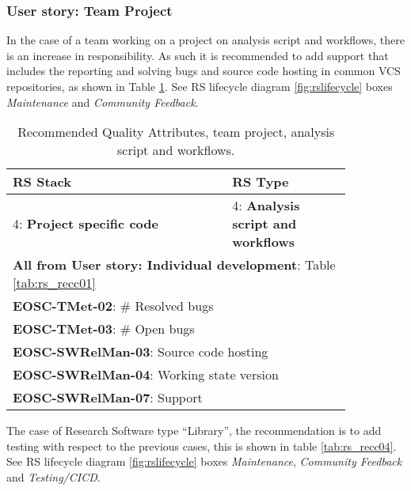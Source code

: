 \subsubsection{User story: Team Project}

In the case of a team working on a project on analysis script and workflows, there is an increase in responsibility. As such it is recommended to add support that includes the reporting and solving bugs and source code hosting in common VCS repositories, as shown in Table \ref{tab:rs_recc03}. See RS lifecycle diagram \ref{fig:rslifecycle} boxes \textit{Maintenance} and \textit{Community Feedback}.

\begin{table}[h]
  \centering
  \scriptsize
  \begin{tabular}{|p{0.55\linewidth}|p{0.3\linewidth}|} \hline

    \textbf{RS Stack} & \textbf{RS Type} \\ \hline \hline
    4: \textbf{Project specific code} & 4: \textbf{Analysis script and workflows} \\ \hline
    \multicolumn{2}{|l|}{\textbf{All from User story: Individual development}: Table \ref{tab:rs_recc01}} \\ \hline
    \multicolumn{2}{|l|}{\textbf{EOSC-TMet-02}: \# Resolved bugs} \\ \hline
    \multicolumn{2}{|l|}{\textbf{EOSC-TMet-03}: \# Open bugs} \\ \hline
    \multicolumn{2}{|l|}{\textbf{EOSC-SWRelMan-03}: Source code hosting} \\ \hline
    \multicolumn{2}{|l|}{\textbf{EOSC-SWRelMan-04}: Working state version} \\ \hline
    \multicolumn{2}{|l|}{\textbf{EOSC-SWRelMan-07}: Support} \\ \hline

  \end{tabular}
  \caption{Recommended Quality Attributes, team project, analysis script and workflows.}
  \label{tab:rs_recc03}
\end{table}

The case of Research Software type ``Library'', the recommendation is to add testing with respect to the previous cases, this is shown in table \ref{tab:rs_recc04}.
See RS lifecycle diagram \ref{fig:rslifecycle} boxes \textit{Maintenance}, \textit{Community Feedback} and \textit{Testing/CICD}.

